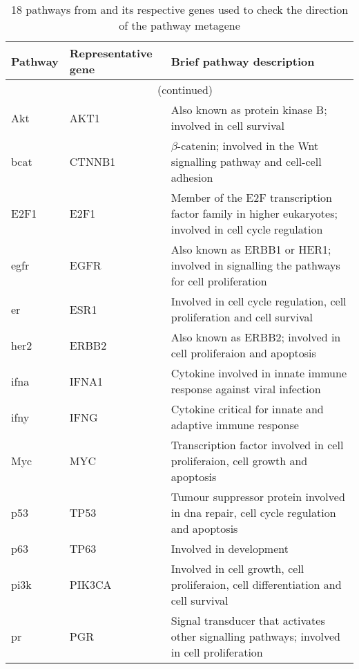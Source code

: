 \begin{longtable}{llp{8cm}}
	\caption{18 pathways from \citet{Gatza2010a} and its respective genes used to check the direction of the pathway metagene}
	\label{tab:metagene_direction}\\
	\centering
	Pathway & Representative gene & Brief pathway description\\
	\hline
	\hline
	\endfirsthead
	\multicolumn{3}{c}{\tablename\ \thetable{}\ (continued)}\\
	\hline
	\hline
	\endhead
	\hline
	\hline
	\endlastfoot
	\rule{0pt}{2.25ex}Akt         & AKT1   & Also known as protein kinase B; involved in cell survival\\
	\hline
	\rule{0pt}{2.25ex}\gls{bcat}  & CTNNB1 & $\beta$-catenin; involved in the Wnt signalling pathway and cell-cell adhesion\\
	\hline
	\rule{0pt}{2.25ex}E2F1        & E2F1   & Member of the E2F transcription factor family in higher eukaryotes; involved in cell cycle regulation\\
	\hline
	\rule{0pt}{2.25ex}\Gls{egfr}  & EGFR   & Also known as ERBB1 or HER1; involved in signalling the pathways for cell proliferation \\
	\hline
	\rule{0pt}{2.25ex}\Gls{er}    & ESR1   & Involved in cell cycle regulation, cell proliferation and cell survival\\
	\hline
	\rule{0pt}{2.25ex}\Gls{her2}  & ERBB2  & Also known as ERBB2; involved in cell proliferaion and apoptosis\\
	\hline
	\rule{0pt}{2.25ex}\Gls{ifna}  & IFNA1  & Cytokine involved in innate immune response against viral infection\\
	\hline
	\rule{0pt}{2.25ex}\Gls{ifny}  & IFNG   & Cytokine critical for innate and adaptive immune response\\
	\hline
	\rule{0pt}{2.25ex}Myc         & MYC    & Transcription factor involved in cell proliferaion, cell growth and apoptosis\\
	\hline
	\rule{0pt}{2.25ex}p53         & TP53   & Tumour suppressor protein involved in \acrshort{dna} repair, cell cycle regulation and apoptosis\\
	\hline
	\rule{0pt}{2.25ex}p63         & TP63   & Involved in development\\
	\hline
	\rule{0pt}{2.25ex}\Gls{pi3k}  & PIK3CA & Involved in cell growth, cell proliferaion, cell differentiation and cell survival\\
	\hline
	\rule{0pt}{2.25ex}\Gls{pr}    & PGR    & Signal transducer that activates other signalling pathways; involved in cell proliferation\\

\end{longtable}
